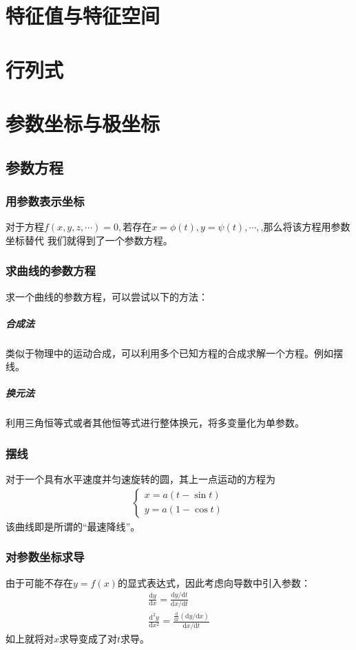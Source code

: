 \documentclass[12pt,a4paper,UTF8]{ctexbook}
\theoremstyle{plain}
\begin{document}
\chapter{特征值与特征空间}
\chapter{行列式}

\chapter{参数坐标与极坐标}
\section{参数方程}
\subsection{用参数表示坐标}
对于方程$f(x,y,z,\cdots)=0,$若存在$x=\phi(t),y=\psi(t),\cdots,$,那么将该方程用参数坐标替代
我们就得到了一个参数方程。
\subsection{求曲线的参数方程}
求一个曲线的参数方程，可以尝试以下的方法：
\paragraph{合成法}类似于物理中的运动合成，可以利用多个已知方程的合成求解一个方程。例如摆线。
\paragraph{换元法}利用三角恒等式或者其他恒等式进行整体换元，将多变量化为单参数。
\subsection{摆线}
对于一个具有水平速度并匀速旋转的圆，其上一点运动的方程为
\begin{align*}
\left\{\begin{array}{lc}x=a(t-\sin t)\\y=a(1-\cos t)\end{array}\right.
\end{align*}
该曲线即是所谓的“最速降线”。
\subsection{对参数坐标求导}
由于可能不存在$y=f(x)$的显式表达式，因此考虑向导数中引入参数：
\begin{align*}
    &\frac{\mathrm{d} y}{\mathrm d x}=\frac{\mathrm d y/\mathrm d t}{\mathrm d x/\mathrm d t}&\\
    &\frac{\mathrm{d^2} y}{\mathrm d x^2}=\frac{\frac{\mathrm d }{\mathrm d t}(\mathrm d y/\mathrm d x)}{\mathrm d x/\mathrm d t}&
\end{align*}
如上就将对$x$求导变成了对$t$求导。
\end{document}
